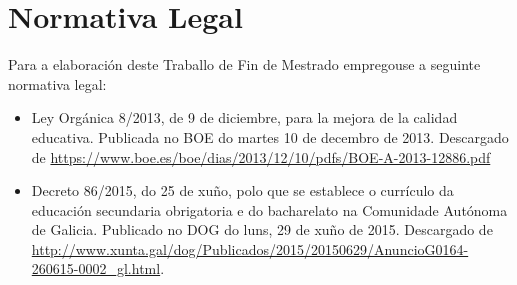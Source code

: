 \chapter{Normativa Legal}
Para a elaboración deste Traballo de Fin de Mestrado empregouse a seguinte normativa legal:
\sloppy
\begin{itemize}
    \item Ley Orgánica 8/2013, de 9 de diciembre, para la mejora de la calidad educativa. Publicada no BOE do martes 10 de decembro de 2013. Descargado de \href{https://www.boe.es/boe/dias/2013/12/10/pdfs/BOE-A-2013-12886.pdf}{https://www.boe.es/boe/dias/2013/12/10/pdfs/BOE-A-2013-12886.pdf}
    \item Decreto 86/2015, do 25 de xuño, polo que se establece o currículo da educación secundaria obrigatoria e do bacharelato na Comunidade Autónoma de Galicia. Publicado no DOG do luns, 29 de xuño de 2015. Descargado de \href{http://www.xunta.gal/dog/Publicados/2015/20150629/AnuncioG0164-260615-0002\_gl.html}{http://www.xunta.gal/dog/Publicados/2015/20150629/AnuncioG0164-260615-0002\_gl.html}.
\end{itemize}
